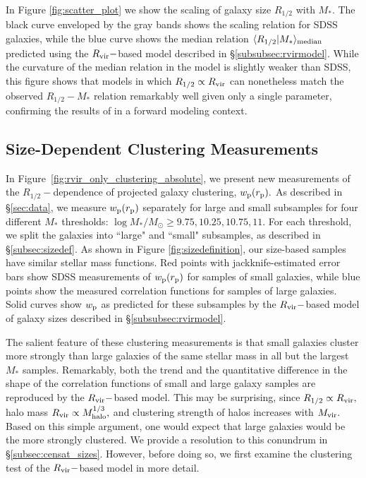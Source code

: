\documentclass[usenatbib,usegraphicx,letterpaper]{mn2e}
\newcommand{\rhalf}{R_{1/2}}
\newcommand{\mstar}{M_{\ast}}
\newcommand{\mvir}{M_{\rm vir}}
\newcommand{\mhalo}{M_{\rm halo}}
\newcommand{\rvir}{R_{\rm vir}}
\newcommand{\rproj}{r_{\rm p}}
\newcommand{\wproj}{w_{\rm p}}
\newcommand{\median}[2]{\langle{#1}\vert{#2}\rangle_{\rm median}}
\newcommand{\msun}{M_\odot}
\begin{document}
In Figure \ref{fig:scatter_plot} we show the scaling of galaxy size $\rhalf$ with $\mstar.$ The black curve enveloped by the gray bands shows the scaling relation for SDSS galaxies, while the blue curve shows the median relation  $\median{\rhalf}{\mstar}$ predicted using the $\rvir-$based model described in \S\ref{subsubsec:rvirmodel}. While the curvature of the median relation in the model is slightly weaker than SDSS, this figure shows that models in which $\rhalf\propto\rvir$ can nonetheless match the observed $\rhalf-\mstar$ relation remarkably well given only a single parameter, confirming the results of \citet{kravtsov13} in a forward modeling context.

\subsection{Size-Dependent Clustering Measurements}
\label{subsec:clustering_results}

In Figure~\ref{fig:rvir_only_clustering_absolute}, we present new measurements of the $\rhalf-$dependence of projected galaxy clustering, $\wproj(\rproj).$ As described in \S\ref{sec:data}, we measure $\wproj(\rproj)$ separately for large and small subsamples for four different $\mstar$ thresholds: $\log\mstar/\msun\geq 9.75, 10.25, 10.75, 11.$ 
For each threshold, we split the galaxies into ``large" and ``small" subsamples, as described in \S\ref{subsec:sizedef}. As shown in Figure \ref{fig:sizedefinition}, our size-based samples  have similar stellar mass functions. Red points with jackknife-estimated error bars show SDSS measurements of $\wproj(\rproj)$ for samples of small galaxies, while blue points show the measured correlation functions for samples of large galaxies. Solid curves show $\wproj$ as predicted for these subsamples by the $\rvir-$based model of galaxy sizes described in \S\ref{subsubsec:rvirmodel}.

The salient feature of these clustering measurements is that small galaxies cluster more strongly than large galaxies of the same stellar mass in all but the largest $\mstar$ samples. Remarkably, both the trend and the quantitative difference in the shape of the correlation functions of small and large galaxy samples are reproduced by the $\rvir-$based model. This may be surprising, since $\rhalf\propto\rvir,$ halo mass $\rvir\propto\mhalo^{1/3},$ and clustering strength of halos increases with $\mvir.$ Based on this simple argument, one would expect that large galaxies would be the more strongly clustered. We provide a resolution to this conundrum in \S\ref{subsec:censat_sizes}. However,  before doing so, we first examine the clustering test of the $\rvir-$based model in more detail.
\end{document}
